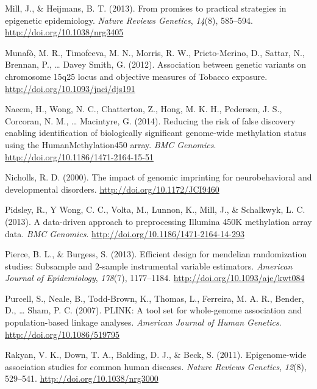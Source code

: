 \documentclass[11pt,twoside]{bristolthesis}
\newlength{\cslhangindent}
\newenvironment{cslreferences}%
  {\setlength{\parindent}{0pt}%
  \everypar{\setlength{\hangindent}{\cslhangindent}}\ignorespaces}%
  {\par}
\begin{document}
\begin{cslreferences}
\leavevmode\hypertarget{ref-Mill2013}{}%
Mill, J., \& Heijmans, B. T. (2013). From promises to practical strategies in epigenetic epidemiology. \emph{Nature Reviews Genetics}, \emph{14}(8), 585--594. \url{http://doi.org/10.1038/nrg3405}

\leavevmode\hypertarget{ref-Munafo2012}{}%
Munafò, M. R., Timofeeva, M. N., Morris, R. W., Prieto-Merino, D., Sattar, N., Brennan, P., \ldots{} Davey Smith, G. (2012). Association between genetic variants on chromosome 15q25 locus and objective measures of Tobacco exposure. \url{http://doi.org/10.1093/jnci/djs191}

\leavevmode\hypertarget{ref-Naeem2014}{}%
Naeem, H., Wong, N. C., Chatterton, Z., Hong, M. K. H., Pedersen, J. S., Corcoran, N. M., \ldots{} Macintyre, G. (2014). Reducing the risk of false discovery enabling identification of biologically significant genome-wide methylation status using the HumanMethylation450 array. \emph{BMC Genomics}. \url{http://doi.org/10.1186/1471-2164-15-51}

\leavevmode\hypertarget{ref-Nicholls2000}{}%
Nicholls, R. D. (2000). The impact of genomic imprinting for neurobehavioral and developmental disorders. \url{http://doi.org/10.1172/JCI9460}

\leavevmode\hypertarget{ref-Pidsley2013}{}%
Pidsley, R., Y Wong, C. C., Volta, M., Lunnon, K., Mill, J., \& Schalkwyk, L. C. (2013). A data-driven approach to preprocessing Illumina 450K methylation array data. \emph{BMC Genomics}. \url{http://doi.org/10.1186/1471-2164-14-293}

\leavevmode\hypertarget{ref-Pierce2013}{}%
Pierce, B. L., \& Burgess, S. (2013). Efficient design for mendelian randomization studies: Subsample and 2-sample instrumental variable estimators. \emph{American Journal of Epidemiology}, \emph{178}(7), 1177--1184. \url{http://doi.org/10.1093/aje/kwt084}

\leavevmode\hypertarget{ref-Purcell2007}{}%
Purcell, S., Neale, B., Todd-Brown, K., Thomas, L., Ferreira, M. A. R., Bender, D., \ldots{} Sham, P. C. (2007). PLINK: A tool set for whole-genome association and population-based linkage analyses. \emph{American Journal of Human Genetics}. \url{http://doi.org/10.1086/519795}

\leavevmode\hypertarget{ref-Rakyan2011}{}%
Rakyan, V. K., Down, T. A., Balding, D. J., \& Beck, S. (2011). Epigenome-wide association studies for common human diseases. \emph{Nature Reviews Genetics}, \emph{12}(8), 529--541. \url{http://doi.org/10.1038/nrg3000}


\end{cslreferences}
\end{document}
